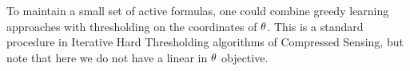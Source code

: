 \begin{remark}
    To maintain a small set of active formulas, one could combine greedy learning approaches with thresholding on the coordinates of $\theta$.
    This is a standard procedure in Iterative Hard Thresholding algorithms of Compressed Sensing, but note that here we do not have a linear in $\theta$ objective.
\end{remark}


%


